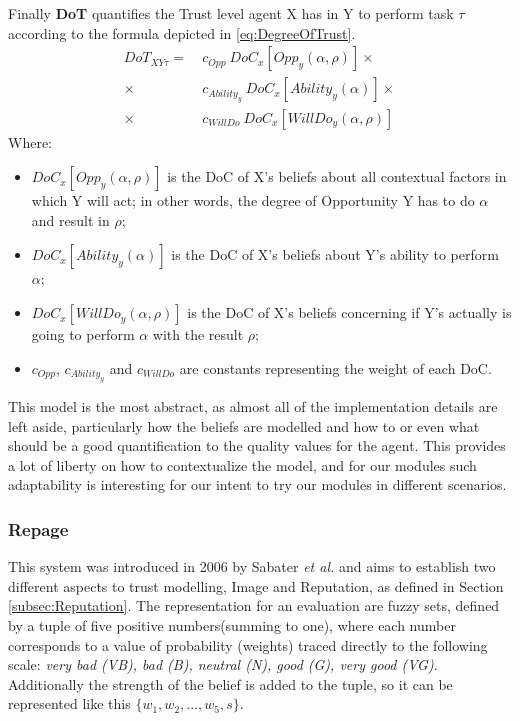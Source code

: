 Finally \textbf{\ac{DoT}} quantifies the Trust level agent X has in Y to perform task $\tau$ according to the formula depicted in \ref{eq:DegreeOfTrust}.
\begin{equation}
	\begin{aligned}
		DoT_{XY\tau} =\ &c_{Opp}\ DoC_x[Opp_y(\alpha, \rho)] \times\\
					    \times\ &c_{Ability_y}\ DoC_x[Ability_y(\alpha)]\times \\
					    \times\ &c_{WillDo}\ DoC_x[WillDo_y(\alpha, \rho)]
	\end{aligned}
	\label{eq:DegreeOfTrust}
\end{equation}
Where:
\begin{itemize}
	\item $DoC_x[Opp_y(\alpha, \rho)]$ is the \ac{DoC} of X's beliefs about all contextual factors in which Y will act; in other words, the degree of Opportunity Y has to do $\alpha$ and result in $\rho$;
	\item $DoC_x[Ability_y(\alpha)]$ is the \ac{DoC} of X's beliefs about Y's ability to perform $\alpha$;
	\item $DoC_x[WillDo_y(\alpha, \rho)]$ is the \ac{DoC} of X's beliefs concerning if Y's actually is going to perform $\alpha$ with the result $\rho$;
	\item $c_{Opp}$, $c_{Ability_y}$ and $c_{WillDo}$ are constants representing the weight of each \ac{DoC}.
\end{itemize}

This model is the most abstract, as almost all of the implementation details are left aside, particularly how the beliefs are modelled and how to or even what should be a good quantification to the quality values for the agent. This provides a lot of liberty on how to contextualize the model, and for our modules such adaptability is interesting for our intent to try our modules in different scenarios.

\subsubsection{Repage}
\label{subsubsec:Related work:Trust Models:Repage}
This system was introduced in 2006 by Sabater \textit{et al.}\cite{Sabater2006} and aims to establish two different aspects to trust modelling, Image and Reputation, as defined in Section \ref{subsec:Reputation}. The representation for an evaluation are fuzzy sets, defined by a tuple of five positive numbers(summing to one), where each number corresponds to a value of probability (weights) traced directly to the following scale: \textit{very bad (VB), bad (B), neutral (N), good (G), very good (VG)}. Additionally the strength of the belief is added to the tuple, so it can be represented like this $\{w_1, w_2, ..., w_5, s\}$.

